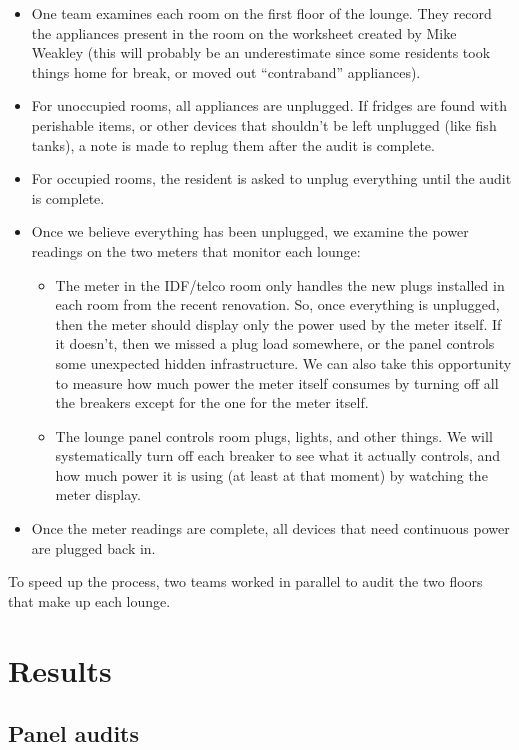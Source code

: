 \documentclass[11pt,final]{article}
\begin{document}
\begin{itemize}
\item One team examines each room on the first floor of the lounge. They record the appliances present in the room on the worksheet created by Mike Weakley (this will probably be an underestimate since some residents took things home for break, or moved out ``contraband'' appliances).
\item For unoccupied rooms, all appliances are unplugged. If fridges are found with perishable items, or other devices that shouldn't be left unplugged (like fish tanks), a note is made to replug them after the audit is complete.
\item For occupied rooms, the resident is asked to unplug everything until the audit is complete.
\item Once we believe everything has been unplugged, we examine the power readings on the two meters that monitor each lounge:
	\begin{itemize}
	\item The meter in the IDF/telco room only handles the new plugs installed in each room from the recent renovation. So, once everything is unplugged, then the meter should display only the power used by the meter itself. If it doesn't, then we missed a plug load somewhere, or the panel controls some unexpected hidden infrastructure. We can also take this opportunity to measure how much power the meter itself consumes by turning off all the breakers except for the one for the meter itself.
	\item The lounge panel controls room plugs, lights, and other things. We will systematically turn off each breaker to see what it actually controls, and how much power it is using (at least at that moment) by watching the meter display.
	\end{itemize}
\item Once the meter readings are complete, all devices that need continuous power are plugged back in.
\end{itemize}

To speed up the process, two teams worked in parallel to audit the two floors that make up each lounge.

\section{Results}
\label{sec:results}

\subsection{Panel audits}
\end{document}
